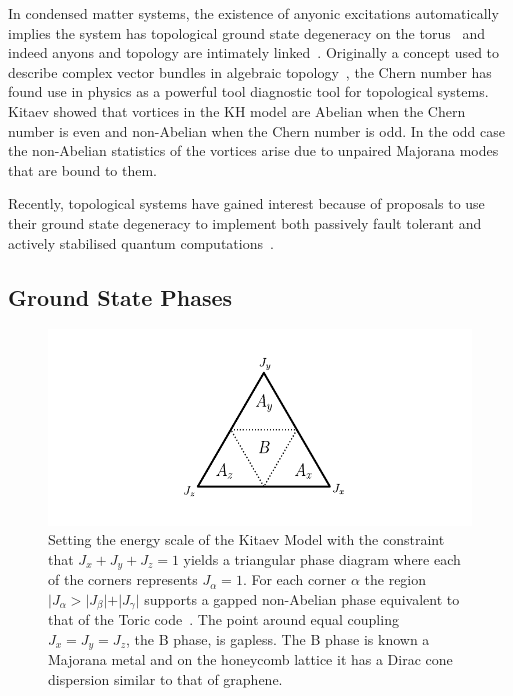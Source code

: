 In condensed matter systems, the existence of anyonic excitations automatically implies the system has topological ground state degeneracy on the torus~\autocite{einarssonFractionalStatisticsTorus1990} and indeed anyons and topology are intimately linked~\autocite{oshikawaTopologicalDegeneracyNonAbelian2007,Chung_Topological_quantum2010,yaoAlgebraicSpinLiquid2009}. Originally a concept used to describe complex vector bundles in algebraic topology~\autocite{chernCharacteristicClassesHermitian1946}, the Chern number has found use in physics as a powerful tool diagnostic tool for topological systems. Kitaev showed that vortices in the KH model are Abelian when the Chern number is even and non-Abelian when the Chern number is odd. In the odd case the non-Abelian statistics of the vortices arise due to unpaired Majorana modes that are bound to them.

Recently, topological systems have gained interest because of proposals to use their ground state degeneracy to implement both passively fault tolerant and actively stabilised quantum computations~\autocite{kitaev_fault-tolerant_2003,poulinStabilizerFormalismOperator2005,hastingsDynamicallyGeneratedLogical2021}.

\hypertarget{ground-state-phases}{%
\subsection{Ground State Phases}\label{ground-state-phases}}

\hypertarget{fig:KH_phase_diagram}{%
\begin{figure}
\centering
\includegraphics[width=1\textwidth,height=\textheight]{figure_code/background_chapter/KH_phase_diagram}
\caption[{Kitaev Honeycomb Model Phase Diagram}]{Setting the energy scale of the Kitaev Model with the constraint that \(J_x + J_y + J_z = 1\) yields a triangular phase diagram where each of the corners represents \(J_\alpha = 1\). For each corner \(\alpha\) the region \(|J_\alpha > |J_\beta| + |J_\gamma|\) supports a gapped non-Abelian phase equivalent to that of the Toric code~\autocite{kitaev1997quantum,kitaev_fault-tolerant_2003}. The point around equal coupling \(J_x = J_y = J_z\), the B phase, is gapless. The B phase is known a Majorana metal and on the honeycomb lattice it has a Dirac cone dispersion similar to that of graphene.}
\label{fig:KH_phase_diagram}
\end{figure}
}

